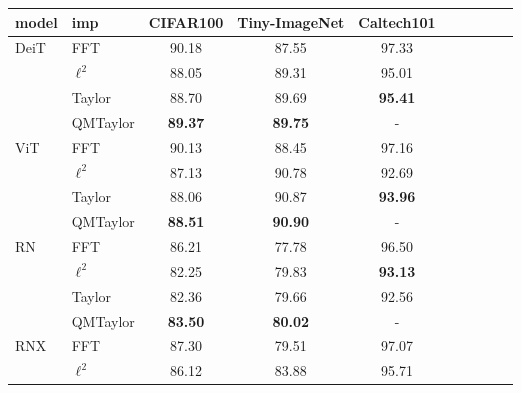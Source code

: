 \begin{table}[htbp]
\tiny
\begin{center}
\begin{tabular}{ll|c|c|c|ccccl}\toprule
model & imp & CIFAR100 & Tiny-ImageNet & Caltech101 \\\midrule
DeiT & FFT & 90.18 & 87.55 & 97.33\\\cmidrule(lr){2-5}
& $\ell^2$ & 88.05 & 89.31 & 95.01 \\
& Taylor & 88.70 & 89.69 & \textbf{95.41} \\
& QMTaylor & \textbf{89.37} & \textbf{89.75} & - \\\midrule
ViT & FFT & 90.13 & 88.45 & 97.16\\\cmidrule(lr){2-5}
& $\ell^2$ & 87.13 & 90.78 & 92.69 \\
& Taylor & 88.06 & 90.87 &\textbf{93.96} \\
& QMTaylor & \textbf{88.51} & \textbf{90.90} & - \\\midrule
RN & FFT & 86.21 & 77.78 & 96.50\\\cmidrule(lr){2-5}
& $\ell^2$ & 82.25 & 79.83 & \textbf{93.13} \\
& Taylor & 82.36 & 79.66 & 92.56 \\
& QMTaylor & \textbf{83.50} & \textbf{80.02} & - \\\midrule
RNX & FFT & 87.30 & 79.51 & 97.07\\\cmidrule(lr){2-5}
& $\ell^2$ & 86.12 & 83.88 & 95.71 \\

\end{tabular}
\end{center}
\end{table}
